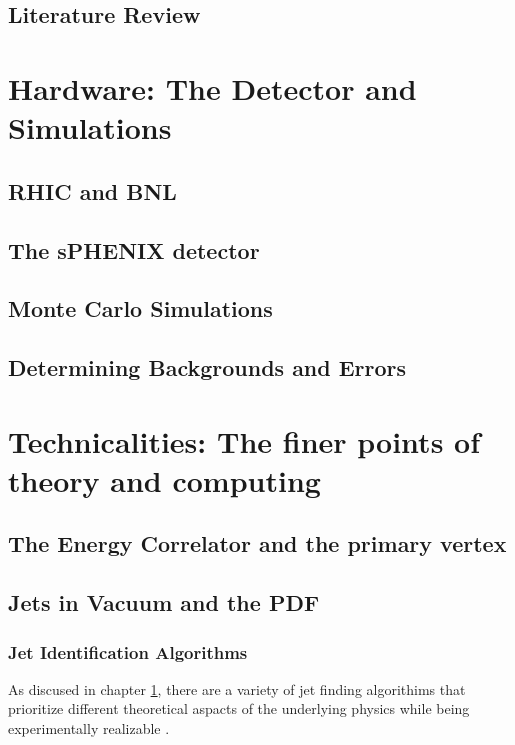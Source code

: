 \documentclass[letterpaper, 12pt, oneside]{book}
\theoremstyle{definition}
\begin{document}
\frontmatter

\setcounter{page}{2}





\tableofcontents
\listoftables
\listoffigures

\mainmatter
\chapter{Literature Review}
\label{ch:LR}
 
\part{Hardware: The Detector and Simulations}

\chapter{RHIC and BNL}
\chapter{The sPHENIX detector}
\chapter{Monte Carlo Simulations}
\chapter{Determining Backgrounds and Errors}
\part{Technicalities: The finer points of theory and computing}
\chapter{The Energy Correlator and the primary vertex}
\chapter{Jets in Vacuum and the PDF}
\section{Jet Identification Algorithms}
As discused in chapter \ref{ch:LR}, there are a variety of jet finding algorithims that prioritize different theoretical aspacts of the underlying physics while being experimentally realizable \cite{Dokshitzer1997} \cite{Atkin2015}. 
\end{document}

